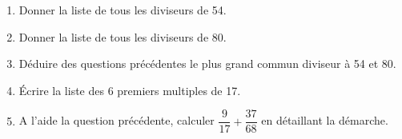 \begin{minipage}{0.99\linewidth}
\exo

\begin{enumerate}
\item Donner la liste de tous les diviseurs de 54.
\item Donner la liste de tous les diviseurs de 80.
\item Déduire des questions précédentes le plus grand commun diviseur à 54 et 80.
\item Écrire la liste des 6 premiers multiples de 17.
\item A l'aide la question précédente, calculer $\dfrac{9}{17} + \dfrac{37}{68}$ en détaillant la démarche.
\end{enumerate}

\end{minipage}

\vspace{0.5cm}